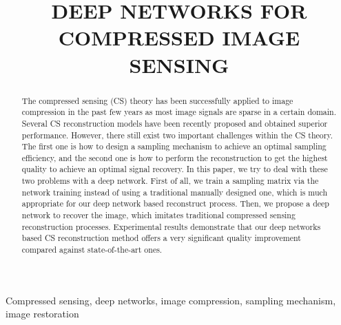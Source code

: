 \documentclass[5pt]{article}
\begin{document}
\sloppy

\def\x{{\mathbf x}}
\def\L{{\cal L}}


\title{DEEP NETWORKS FOR COMPRESSED IMAGE SENSING}
%
\address{Harbin Institute of Technology, NO. 92, Xidazhi Street, Harbin, Heilongjiang  150001}
%
%
%

\maketitle


%
\begin{abstract}
The compressed sensing (CS) theory has been successfully applied to image compression in the past few years as most image signals are sparse in a certain domain. Several CS reconstruction models have been recently proposed and obtained superior performance. However, there still exist two important challenges within the CS theory. The first one is how to design a sampling mechanism to achieve an optimal sampling efficiency, and the second one is how to perform the reconstruction to get the highest quality to achieve an optimal signal recovery. In this paper, we try to deal with these two problems with a deep network. First of all, we train a sampling matrix via the network training instead of using a traditional manually designed one, which is much appropriate for our deep network based reconstruct process. Then, we propose a deep network to recover the image, which imitates traditional compressed sensing reconstruction processes. Experimental results demonstrate that our deep networks based CS reconstruction method offers a very significant quality improvement compared against state-of-the-art ones.
\end{abstract}
%
\begin{keywords}
Compressed sensing, deep networks, image compression, sampling mechanism, image restoration
\end{keywords}
%
\end{document}
